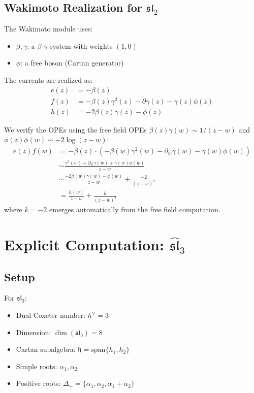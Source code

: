 \subsection{Wakimoto Realization for $\mathfrak{sl}_2$}

\begin{construction}[Wakimoto for $\mathfrak{sl}_2$ at $k=-2$]
The Wakimoto module uses:
\begin{itemize}
\item $\beta, \gamma$: a $\beta$-$\gamma$ system with weights $(1,0)$
\item $\phi$: a free boson (Cartan generator)
\end{itemize}

The currents are realized as:
\begin{align}
e(z) &= -\beta(z) \\
f(z) &= -\beta(z)\gamma^2(z) - \partial\gamma(z) - \gamma(z)\phi(z) \\
h(z) &= -2\beta(z)\gamma(z) - \phi(z)
\end{align}
\end{construction}

\begin{verification}
We verify the OPEs using the free field OPEs $\beta(z)\gamma(w) \sim 1/(z-w)$ and $\phi(z)\phi(w) \sim -2\log(z-w)$:
\begin{align}
e(z)f(w) &= -\beta(z) \cdot (-\beta(w)\gamma^2(w) - \partial_w\gamma(w) - \gamma(w)\phi(w)) \\
&\sim \frac{\gamma^2(w) + \partial_w\gamma(w) + \gamma(w)\phi(w)}{z-w} \\
&\sim \frac{-2\beta(w)\gamma(w) - \phi(w)}{z-w} + \frac{-2}{(z-w)^2} \\
&= \frac{h(w)}{z-w} + \frac{k}{(z-w)^2}
\end{align}
where $k = -2$ emerges automatically from the free field computation.
\end{verification}

\section{Explicit Computation: $\widehat{\mathfrak{sl}}_3$}

\subsection{Setup}

For $\mathfrak{sl}_3$:
\begin{itemize}
\item Dual Coxeter number: $h^\vee = 3$
\item Dimension: $\dim(\mathfrak{sl}_3) = 8$
\item Cartan subalgebra: $\mathfrak{h} = \mathrm{span}\{h_1, h_2\}$
\item Simple roots: $\alpha_1, \alpha_2$
\item Positive roots: $\Delta_+ = \{\alpha_1, \alpha_2, \alpha_1+\alpha_2\}$
\end{itemize}

